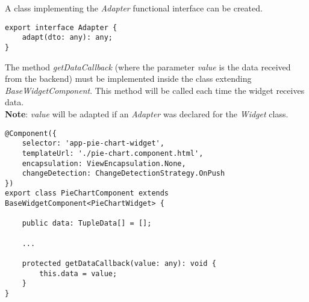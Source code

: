 A class implementing the \textit{Adapter} functional interface can be created.
\begin{lstlisting}[caption={Adapter interface}, style=javaScriptCode]
export interface Adapter {
    adapt(dto: any): any;
}
\end{lstlisting}
The method \textit{getDataCallback} (where the parameter \textit{value} is the data received from the backend) must be implemented inside the class extending \textit{BaseWidgetComponent}. This method will be called each time the widget receives data.\\
\textbf{Note}: \textit{value} will be adapted if an \textit{Adapter} was declared for the \textit{Widget} class.
\begin{lstlisting}[caption={PieChartComponent example}, style=javaScriptCode]
@Component({
    selector: 'app-pie-chart-widget',
    templateUrl: './pie-chart.component.html',
    encapsulation: ViewEncapsulation.None,
    changeDetection: ChangeDetectionStrategy.OnPush
})
export class PieChartComponent extends BaseWidgetComponent<PieChartWidget> {

    public data: TupleData[] = [];
  
    ...

    protected getDataCallback(value: any): void {
        this.data = value;
    }
}
\end{lstlisting}

